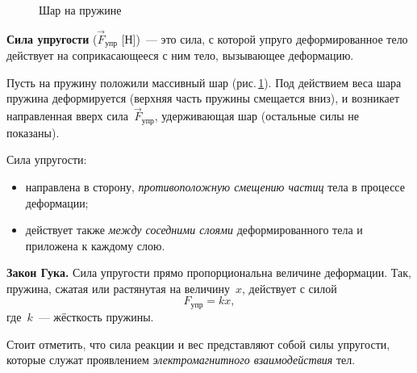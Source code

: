 \documentclass[main.tex]{subfiles}
\begin{document}
{%
\setlength\intextsep{0pt}
\begin{figure}
    \centering
    \caption{Шар на пружине}
    \label{fig:p40}
\end{figure}


\textbf{Сила упругости} ($\vec F_\text{упр}$ [Н])~--- это сила, с которой упруго деформированное тело действует на соприкасающееся с ним тело, вызывающее деформацию. 

Пусть на пружину положили массивный шар (рис.\,\ref{fig:p40}). Под действием веса шара пружина деформируется (верхняя часть пружины смещается вниз), и возникает направленная вверх сила~$\vec F_\text{упр}$, удерживающая шар (остальные силы не показаны).













Сила упругости:
\begin{itemize}
    \item направлена в
    сторону, \emph{противоположную смещению частиц} тела в процессе деформации;
    \item действует также \emph{между соседними слоями} деформированного тела и приложена к каждому слою.
\end{itemize}

}

\begin{law}
    \textbf{Закон Гука.} Сила упругости прямо пропорциональна величине деформации. Так, пружина, сжатая или растянутая на величину~$ x$, действует с силой
    \begin{equation}
    F_\text{упр}=kx,
    \end{equation}
    где~$ k$~--- жёсткость пружины.
\end{law}

Стоит отметить, что сила реакции и вес представляют собой силы упругости, которые служат проявлением \emph{электромагнитного взаимодействия} тел.


 
\end{document}
